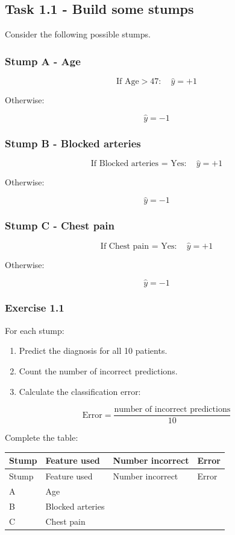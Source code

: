 \documentclass[10pt]{article}
\begin{document}
\subsection*{Task 1.1 - Build some stumps}
Consider the following possible stumps.

\subsubsection*{Stump A - Age}
\[
\text{If Age}>47:
\quad \hat y=+1
\]

Otherwise:

\[
\hat y=-1
\]

\subsubsection*{Stump B - Blocked arteries}
\[
\text{If Blocked arteries = Yes}:
\quad \hat y=+1
\]

Otherwise:

\[
\hat y=-1
\]

\subsubsection*{Stump C - Chest pain}
\[
\text{If Chest pain = Yes}:
\quad \hat y=+1
\]

Otherwise:

\[
\hat y=-1
\]

\subsubsection*{Exercise 1.1}
For each stump:

\begin{enumerate}
\item
Predict the diagnosis for all 10 patients.

\item
Count the number of incorrect predictions.

\item
Calculate the classification error:

\end{enumerate}
\[
\text{Error}
=
\frac{\text{number of incorrect predictions}}{10}
\]

Complete the table:

\begingroup
\small
\setlength{\tabcolsep}{4pt}
\begin{longtable}{l|l|l|l}
Stump & Feature used & Number incorrect & Error \\[1.5pt]
\hline
\endfirsthead
Stump & Feature used & Number incorrect & Error \\[1.5pt]
\hline
\endhead
\rule{0pt}{2.4ex}A & Age &  $\phantom{-0.00}$ &  $\phantom{-0.00}$ \\[3pt]
\rule{0pt}{2.4ex}B & Blocked arteries &  $\phantom{-0.00}$ &  $\phantom{-0.00}$ \\[3pt]
\rule{0pt}{2.4ex}C & Chest pain &  $\phantom{-0.00}$ &  $\phantom{-0.00}$ \\[3pt]
\end{longtable}
\endgroup
\begingroup\color{red}
\end{document}
